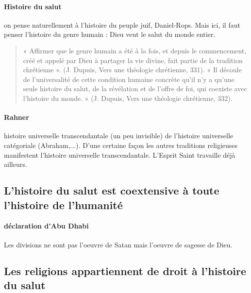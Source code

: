 \paragraph{Histoire du salut} on pense naturellement à l'histoire du peuple juif, Daniel-Rops. Mais ici, il faut penser l'histoire du genre humain : Dieu veut le salut du monde entier. 

\begin{quote}
« Affirmer que le genre humain a été à la fois, et depuis le commencement, créé et appelé par Dieu à
partager la vie divine, fait partie de la tradition chrétienne ». (J. Dupuis, Vers une théologie chrétienne,
331).
« Il découle de l’universalité de cette condition humaine concrète qu’il n’y a qu’une seule histoire du
salut, de la révélation et de l’offre de foi, qui coexiste avec l’histoire du monde. » (J. Dupuis, Vers une
théologie chrétienne, 332).
\end{quote}

\paragraph{Rahner} histoire universelle transcendantale (un peu invisible) de l'histoire universelle catégoriale (Abraham,...). D'une certaine façon les autres traditions religieuses manifestent l'histoire universelle transcendantale.  L'Esprit Saint travaille déjà ailleurs.




\subsection{L’histoire du salut est coextensive à toute l’histoire de l’humanité}
 


\paragraph{déclaration d'Abu Dhabi} Les divisions ne sont pas l'oeuvre de Satan mais l'oeuvre de sagesse de Dieu.



\subsection{Les religions appartiennent de droit à l’histoire du salut}

